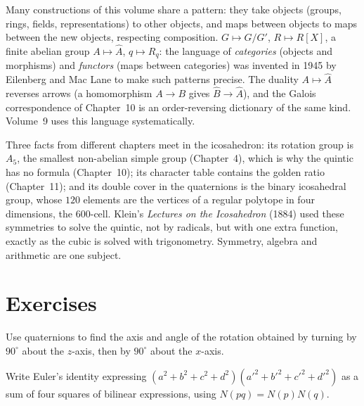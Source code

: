 \begin{remark}
Many constructions of this volume share a pattern: they take objects (groups, rings, fields, representations) to other objects, and maps between objects to maps between the new objects, respecting composition. $G\mapsto G/G'$, $R\mapsto R[X]$, a finite abelian group $A\mapsto\widehat A$, $q\mapsto R_q$: the language of \emph{categories} (objects and morphisms) and \emph{functors} (maps between categories) was invented in 1945 by Eilenberg and Mac Lane to make such patterns precise. The duality $A\mapsto\widehat A$ reverses arrows (a homomorphism $A\to B$ gives $\widehat B\to\widehat A$), and the Galois correspondence of Chapter~10 is an order-reversing dictionary of the same kind. Volume~9 uses this language systematically.
\end{remark}

\begin{beauty}
Three facts from different chapters meet in the icosahedron: its rotation group is $A_5$, the smallest non-abelian simple group (Chapter~4), which is why the quintic has no formula (Chapter~10); its character table contains the golden ratio (Chapter~11); and its double cover in the quaternions is the binary icosahedral group, whose $120$ elements are the vertices of a regular polytope in four dimensions, the $600$-cell. Klein's \emph{Lectures on the Icosahedron} (1884) used these symmetries to solve the quintic, not by radicals, but with one extra function, exactly as the cubic is solved with trigonometry. Symmetry, algebra and arithmetic are one subject.
\end{beauty}

\section{Exercises}

\begin{exercise}[$\star$]\label{ex:compose}
Use quaternions to find the axis and angle of the rotation obtained by turning by $90^\circ$ about the $z$-axis, then by $90^\circ$ about the $x$-axis.
\end{exercise}

\begin{exercise}[$\star$]\label{ex:euler4}
Write Euler's identity expressing $(a^2+b^2+c^2+d^2)(a'^2+b'^2+c'^2+d'^2)$ as a sum of four squares of bilinear expressions, using $N(pq)=N(p)N(q)$.
\end{exercise}


